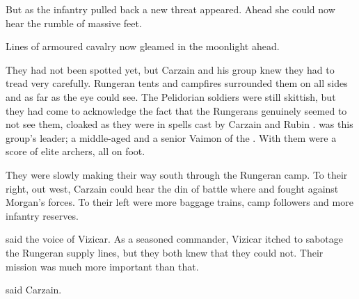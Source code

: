 But as the infantry pulled back a new threat appeared. 
Ahead she could now hear the rumble of massive feet. 


Lines of armoured cavalry now gleamed in the moonlight ahead. 







\begin{comment}
  \subsection{Carzain sneaks in}
\end{comment}
They had not been spotted yet, but Carzain \Shachar and his group knew they had to tread very carefully. 
Rungeran tents and campfires surrounded them on all sides and as far as the eye could see.
The Pelidorian soldiers were still skittish, but they had come to acknowledge the fact that the Rungerans genuinely seemed to not see them, cloaked as they were in spells cast by Carzain and Rubin \Sanyor. 
\Sanyor was this group's leader; a middle-aged \sphyle and a senior Vaimon of the \ishrah. 
With them were a score of elite archers, all on foot. 

They were slowly making their way south through the Rungeran camp. 
To their right, out west, Carzain could hear the din of battle where \Dornaer and \Kintaer fought against Morgan's forces. 
To their left were more baggage trains, camp followers and more infantry reserves. 

 said the voice of Vizicar. 
As a seasoned commander, Vizicar itched to sabotage the Rungeran supply lines, but they both knew that they could not. 
Their mission was much more important than that. 

 said Carzain. 

